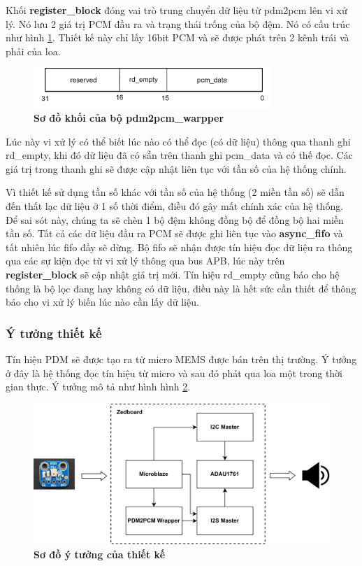 Khối \textbf{register\_block} đóng vai trò trung chuyển dữ liệu từ pdm2pcm lên vi xử lý. Nó lưu 2 giá trị PCM đầu ra và trạng thái trống của bộ đệm. Nó có cấu trúc như hình \ref{bit}. Thiết kế này chỉ lấy 16bit PCM và sẽ được phát trên 2 kênh trái và phải của loa.

\begin{figure}[H]
    \centering
    \includegraphics[width=9cm]{Images/Chuong5/fpga/bit.png}
    \caption[Sơ đồ khối của bộ pdm2pcm\_warpper]{\bfseries \fontsize{12pt}{0pt}\selectfont Sơ đồ khối của bộ pdm2pcm\_warpper}
    \label{bit}
\end{figure}

Lúc này vi xử lý có thể biết lúc nào có thể đọc (có dữ liệu) thông qua thanh ghi rd\_empty, khi đó dữ liệu đã có sẵn trên thanh ghi pcm\_data và có thế đọc. Các giá trị trong thanh ghi sẽ được cập nhật liên tục với tần số của hệ thống chính.

Vì thiết kế sử dụng tần số khác với tần số của hệ thống (2 miền tần số) sẽ dẫn đến thất lạc dữ liệu ở 1 số thời điểm, điều đó gây mất chính xác của hệ thống. Để  sai sót này, chúng ta sẽ chèn 1 bộ đệm không đồng bộ để đồng bộ hai miền tần số. Tất cả các dữ liệu đầu ra PCM sẽ được ghi liên tục vào \textbf{async\_fifo} và tất nhiên lúc fifo đầy sẽ dừng. Bộ fifo sẽ nhận được tín hiệu đọc dữ liệu ra thông qua các sự kiện đọc từ vi xử lý thông qua bus APB, lúc này trên \textbf{register\_block} sẽ cập nhật giá trị mới. Tín hiệu rd\_empty cũng báo cho hệ thống là bộ lọc đang hay không có dữ liệu, điều này là hết sức cần thiết để thông báo cho vi xử lý biến lúc nào cần lấy dữ liệu.

\subsubsection{Ý tưởng thiết kế}

Tín hiệu PDM sẽ được tạo ra từ micro MEMS được bán trên thị trường. Ý tưởng ở đây là hệ thống đọc tín hiệu từ micro và sau đó phát qua loa một trong thời gian thực.
Ý tưởng mô tả như hình hình \ref{pinouts}.
\begin{figure}[H]
    \centering
    \includegraphics[width=14cm]{Images/Chuong5/fpga/top.png}
    \caption[Sơ đồ ý tưởng của thiết kế]{\bfseries \fontsize{12pt}{0pt}\selectfont Sơ đồ ý tưởng của thiết kế}
    \label{pinouts}
\end{figure}

